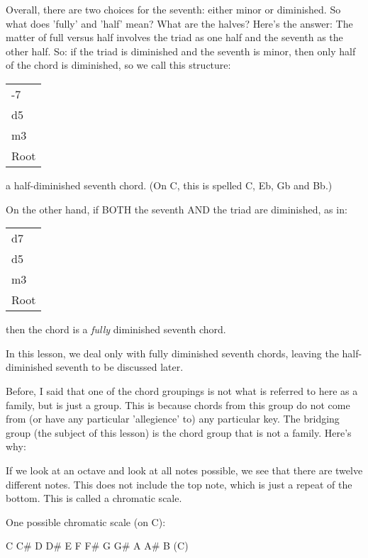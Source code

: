 Overall, there are two choices for the seventh: either minor or diminished.
So what does 'fully' and 'half' mean? What are the halves? Here's the answer:
The matter of full versus half involves the triad as one half and the seventh
as the other half. So: if the triad is diminished and the seventh is minor,
then only half of the chord is diminished, so we call this structure:

\begin{center}
\begin{tabular}{ | l | }
  \hline
  -7\\
  d5\\
  m3\\
  Root\\
  \hline
\end{tabular}
\end{center}

a half-diminished seventh chord. (On C, this is spelled C, Eb, Gb and Bb.)

On the other hand, if BOTH the seventh AND the triad are diminished, as in:

\begin{center}
\begin{tabular}{ | l | }
  \hline
  d7\\
  d5\\
  m3\\
  Root\\
  \hline
\end{tabular}
\end{center}

then the chord is a \emph{fully} diminished seventh chord.

In this lesson, we deal only with fully diminished seventh chords, leaving
the half-diminished seventh to be discussed later.

Before, I said that one of the chord groupings is not what is referred to
here as a family, but is just a group. This is because chords from this group
do not come from (or have any particular 'allegience' to) any particular key.
The bridging group (the subject of this lesson) is the chord group that is not
a family. Here's why:

If we look at an octave and look at all notes possible, we see that there
are twelve different notes. This does not include the top note, which is just
a repeat of the bottom. This is called a chromatic scale.

One possible chromatic scale (on C):

\begin{center}
C    C\#   D    D\#   E    F    F\#   G    G\#   A    A\#   B    (C)
\end{center}

